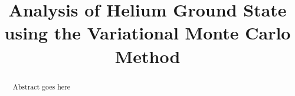 \documentclass[conference]{IEEEtran}
\begin{document}
\title{Analysis of Helium Ground State using the Variational Monte Carlo Method}


\author{
\and
{}
\and
{}
}


\maketitle


\begin{abstract}

Abstract goes here

\end{abstract}

\IEEEpeerreviewmaketitle















\end{document}
